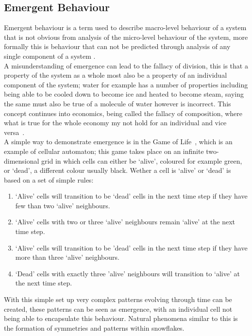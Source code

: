 \documentclass{article}
\begin{document}
\subsection{Emergent Behaviour}
Emergent behaviour is a term used to describe macro-level behaviour of a system that is not obvious from analysis of the micro-level behaviour of the system, more formally this is behaviour that can not be predicted through analysis of any single component of a system \cite{EB_systemofsystemsGLangford}.\\
A misunderstanding of emergence can lead to the fallacy of division, this is that a property of the system as a whole most also be a property of an individual component of the system; water for example has a number of properties including being able to be cooled down to become ice and heated to become steam, saying the same must also be true of a molecule of water however is incorrect. This concept continues into economics, being called the fallacy of composition, where what is true for the whole economy my not hold for an individual and vice versa~\cite{fallacyofcompostionBook}.\\       
A simple way to demonstrate emergence is in the Game of Life~\cite{gameoflifepage}, which is an example of cellular automaton; this game takes place on an infinite two-dimensional grid in which cells can either be `alive', coloured for example green, or `dead', a different colour usually black. Wether a cell is `alive' or `dead' is based on a set of simple rules:   
\begin{enumerate}
  \item `Alive' cells will transition to be `dead' cells in the next time step if they have few than two `alive' neighbours.
  \item `Alive' cells with two or three `alive' neighbours remain `alive' at the next time step.
  \item `Alive' cells will transition to be 'dead' cells in the next time step if they have more than three `alive' neighbours.
  \item `Dead' cells with exactly three 'alive' neighbours will transition to `alive' at the next time step.
\end{enumerate}
With this simple set up very complex patterns evolving through time can be created, these patterns can be seen as emergence, with an individual cell not being able to encapsulate this behaviour. Natural phenomena similar to this is the formation of symmetries and patterns within snowflakes.\\
\end{document}
